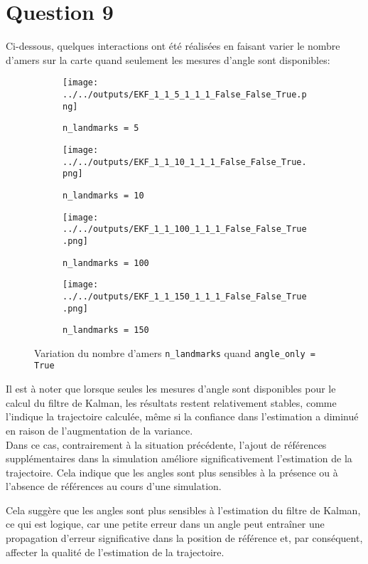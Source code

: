\documentclass[../CSC_5RO12_TA_TP2.tex]{subfiles}
\begin{document}
\section{Question 9}
\noindent Ci-dessous, quelques interactions ont été réalisées en faisant varier le nombre d'amers sur la carte quand seulement les mesures d'angle sont disponibles:
\begin{figure}[H]
    \centering
    \begin{subfigure}[b]{0.475\textwidth}
        \centering
        \texttt{[image: ../../outputs/EKF\_1\_1\_5\_1\_1\_1\_False\_False\_True.png]}
        \caption{\texttt{n\_landmarks = 5}}
        \label{}
    \end{subfigure}\hfill
    \begin{subfigure}[b]{0.475\textwidth}
        \centering
        \texttt{[image: ../../outputs/EKF\_1\_1\_10\_1\_1\_1\_False\_False\_True.png]}
        \caption{\texttt{n\_landmarks = 10}}
        \label{}
    \end{subfigure}
    \begin{subfigure}[b]{0.475\textwidth}
        \centering
        \texttt{[image: ../../outputs/EKF\_1\_1\_100\_1\_1\_1\_False\_False\_True.png]}
        \caption{\texttt{n\_landmarks = 100}}
        \label{}
    \end{subfigure}\hfill
    \begin{subfigure}[b]{0.475\textwidth}
        \centering
        \texttt{[image: ../../outputs/EKF\_1\_1\_150\_1\_1\_1\_False\_False\_True.png]}
        \caption{\texttt{n\_landmarks = 150}}
        \label{}
    \end{subfigure}
    \caption{Variation du nombre d'amers \texttt{n\_landmarks} quand \texttt{angle\_only = True}}
    \label{}
\end{figure}
\noindent Il est à noter que lorsque seules les mesures d'angle sont disponibles pour le calcul du filtre de Kalman, les résultats restent relativement stables, comme l'indique la trajectoire calculée, même si la confiance dans l'estimation a diminué en raison de l'augmentation de la variance.\\

\noindent Dans ce cas, contrairement à la situation précédente, l'ajout de références supplémentaires dans la simulation améliore significativement l'estimation de la trajectoire. Cela indique que les angles sont plus sensibles à la présence ou à l'absence de références au cours d'une simulation.
\begin{remark}
    Cela suggère que les angles sont plus sensibles à l'estimation du filtre de Kalman, ce qui est logique, car une petite erreur dans un angle peut entraîner une propagation d'erreur significative dans la position de référence et, par conséquent, affecter la qualité de l'estimation de la trajectoire.
\end{remark}
\end{document}
